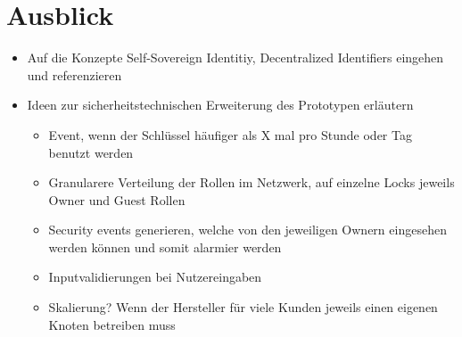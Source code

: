     
\section{Ausblick}
\label{sec:end_further}
	\begin{itemize}[noitemsep]
		\item Auf die Konzepte Self-Sovereign Identitiy, Decentralized Identifiers eingehen und referenzieren
		\item Ideen zur sicherheitstechnischen Erweiterung des Prototypen erläutern
		\begin{itemize}[noitemsep]
		    \item Event, wenn der Schlüssel häufiger als X mal pro Stunde oder Tag benutzt werden
		    \item Granularere Verteilung der Rollen im Netzwerk, auf einzelne Locks jeweils Owner und Guest Rollen
		    \item Security events generieren, welche von den jeweiligen Ownern eingesehen werden können und somit alarmier werden
		    \item Inputvalidierungen bei Nutzereingaben
		    \item Skalierung? Wenn der Hersteller für viele Kunden jeweils einen eigenen Knoten betreiben muss
		\end{itemize}
	\end{itemize}
